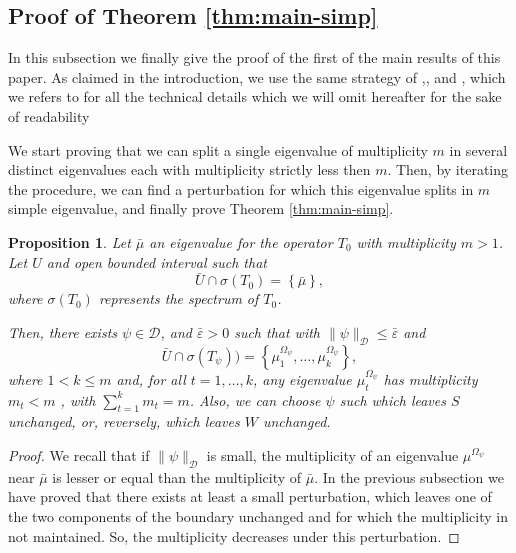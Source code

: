 \documentclass[a4paper,reqno,11pt,oneside]{amsart}
\theoremstyle{plain}
\theoremstyle{plain}
\theoremstyle{plain}
\newtheorem{prop}[thm]{Proposition}
\theoremstyle{remark}
\begin{document}
\subsection{Proof of Theorem \ref{thm:main-simp}}
In this subsection we finally give the proof of the first of the main results of this paper. As claimed in the introduction, we use the same strategy of \cite[Proof of Thm 1]{fgmp},\cite[Sec 5]{MiSNS}, and \cite[Lemma 7]{mi2}, which we refers to for all the technical details which we will omit hereafter for the sake of readability
 
We start proving that we can split a single eigenvalue of multiplicity $m$ in several distinct  eigenvalues each with multiplicity strictly less then $m$. Then, by iterating the procedure, we can find a perturbation for which this eigenvalue splits in $m$ simple eigenvalue, and finally prove  Theorem \ref{thm:main-simp}.

\begin{prop}
\label{thm:main-tool} Let $\bar \mu$ an eigenvalue for the operator $T_0$ with
multiplicity $m>1$. Let $U$ and open bounded interval such
that 
\[
\bar{U}\cap\sigma\left(T_0\right)=\left\{ \bar{\mu}\right\} ,
\]
where $\sigma(T_0)$  represents  the spectrum of $T_0$. 

Then, there exists $\psi\in \mathcal{D}$, and $\bar\varepsilon>0$  such that with $\|\psi\|_{\mathcal{D}}\le\bar\varepsilon$ and
\[
\bar{U}\cap\sigma(T_\psi))=\left\{ \mu_{1}^{{\Omega_\psi}},\dots,\mu_{k}^{{\Omega_\psi}}\right\} ,
\]
where $1<k\le m$ and, for all $t=1,\dots, k$, any eigenvalue $\mu_{t}^{{\Omega_\psi}}$ has multiplicity $m_t<m$ , with $\sum_{t=1}^{k}m_{t}=m$.
Also, we can choose $\psi$ such which leaves $S$ unchanged,  or, reversely, which  leaves $W$ unchanged.
\end{prop}
\begin{proof}
We recall that if $\|\psi\|_{\mathcal{D}}$ is small, the multiplicity of an eigenvalue $\mu^{\Omega_\psi}$ near $\bar{\mu}$ is lesser or equal than the multiplicity of $\bar{\mu}$.
In the previous subsection we have proved that there exists at least a small perturbation, which leaves one of the two components of the boundary unchanged and for which the multiplicity in not maintained. So, the multiplicity decreases under this perturbation.
\end{proof}
\end{document}
